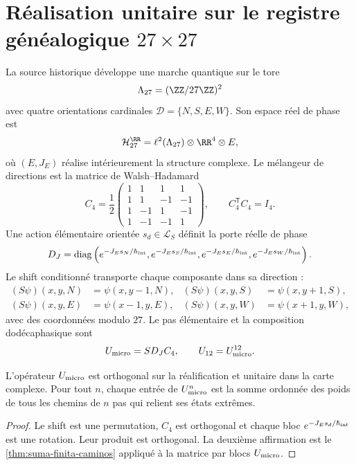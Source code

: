 \section{Réalisation unitaire sur le registre généalogique \(27\times27\)}

La source historique développe une marche quantique sur le tore
\[
 \Lambda_{27}=(\ZZ/27\ZZ)^2
\]
avec quatre orientations cardinales
\(\mathcal D=\{N,S,E,W\}\). Son espace réel de phase est
\[
 \mathcal H_{27}^{\RR}
 =\ell^2(\Lambda_{27})\otimes\RR^4\otimes E,
\]
où \((E,J_E)\) réalise intérieurement la structure complexe. Le mélangeur
de directions est la matrice de Walsh--Hadamard
\[
 C_4=\frac12
 \begin{pmatrix}
 1&1&1&1\\
 1&1&-1&-1\\
 1&-1&1&-1\\
 1&-1&-1&1
 \end{pmatrix},
 \qquad C_4^{\mathsf T}C_4=I_4.
\]
Une action élémentaire orientée \(s_d\in\mathcal L_S\) définit la porte
réelle de phase
\[
 D_J=\operatorname{diag}
 \left(
  e^{-J_Es_N/\hbar_{\rm int}},
  e^{-J_Es_S/\hbar_{\rm int}},
  e^{-J_Es_E/\hbar_{\rm int}},
  e^{-J_Es_W/\hbar_{\rm int}}
 \right).
\]
Le shift conditionné transporte chaque composante dans sa direction :
\begin{align*}
 (S\psi)(x,y,N)&=\psi(x,y-1,N),&
 (S\psi)(x,y,S)&=\psi(x,y+1,S),\\
 (S\psi)(x,y,E)&=\psi(x-1,y,E),&
 (S\psi)(x,y,W)&=\psi(x+1,y,W),
\end{align*}
avec des coordonnées modulo \(27\). Le pas élémentaire et la composition
dodécaphasique sont
\begin{equation}
 U_{\rm micro}=S D_J C_4,
 \qquad
 U_{12}=U_{\rm micro}^{12}.
 \label{eq:unitario-ledger-27}
\end{equation}

\begin{proposition}
L'opérateur \(U_{\rm micro}\) est orthogonal sur la réalification et unitaire
dans la carte complexe. Pour tout \(n\), chaque entrée de
\(U_{\rm micro}^n\) est la somme ordonnée des poids de tous les chemins de
\(n\) pas qui relient ses états extrêmes.
\end{proposition}

\begin{proof}
Le shift est une permutation, \(C_4\) est orthogonal et chaque bloc
\(e^{-J_Es_d/\hbar_{\rm int}}\) est une rotation. Leur produit est orthogonal.
La deuxième affirmation est le
\cref{thm:suma-finita-caminos} appliqué à la matrice par blocs
\(U_{\rm micro}\).
\end{proof}

